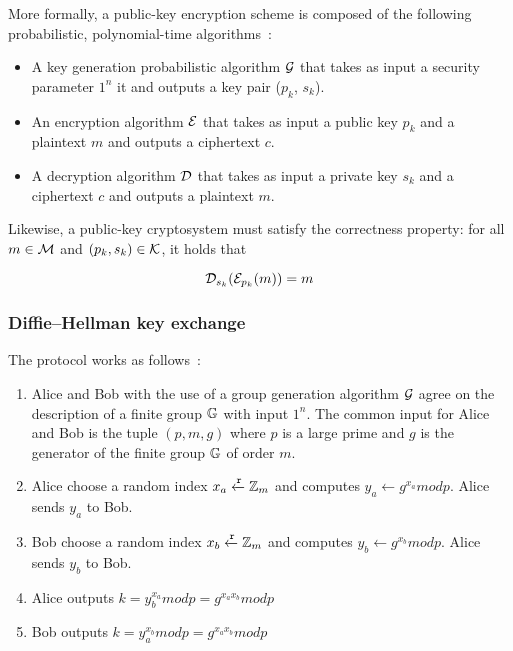 More formally, a public-key encryption scheme is composed of the following probabilistic, polynomial-time algorithms~\cite{Katz:2014:IMC:2700550, kiagias:crypto}:

\begin{itemize}
  \item A key generation probabilistic algorithm $\mathcal{G}$ that takes as input a security parameter $1^{n}$ it and outputs a key pair ($p_k$, $s_k$).
  \item An encryption algorithm $\mathcal{E}$ that takes as input a public key $p_k$ and a plaintext $m$ and outputs a ciphertext $c$.
  \item A decryption algorithm $\mathcal{D}$ that takes as input a private key $s_k$ and a ciphertext $c$ and outputs a plaintext $m$.
\end{itemize}

Likewise, a public-key cryptosystem must satisfy the correctness property: for all $m \in \mathcal{M}$ and $(p_k, s_k) \in \mathcal{K}$, it holds that

\begin{equation*}
  \mathcal{D}_{s_k}(\mathcal{E}_{p_k}(m)) = m
\end{equation*}

\subsubsection{Diffie–Hellman key exchange}
\label{preliminaries:crypto_block:pub:dh}

The protocol works as follows~\cite{Katz:2014:IMC:2700550, kiagias:crypto}:

\begin{enumerate}
  \item Alice and Bob  with the use of a group generation algorithm $\mathcal{G}$ agree on the description of a finite group $\mathbb{G}$ with input $1^{n}$. The common input for Alice and Bob is the tuple $(p, m, g)$ where $p$ is a large prime and $g$ is the generator of the finite group $\mathbb{G}$ of order $m$.
  \item Alice choose a random index $x_a \xleftarrow{\mathtt{r}}{\mathbb{Z}_m}$ and computes $y_a \leftarrow{g^{x_a}}modp$. Alice sends $y_a$ to Bob.
  \item Bob choose a random index $x_b \xleftarrow{\mathtt{r}}{\mathbb{Z}_m}$ and computes $y_b \leftarrow{g^{x_b}}modp$. Alice sends $y_b$ to Bob.
  \item Alice outputs $k = y_b^{x_a}modp = g^{{x_a}{x_b}}modp$
  \item Bob outputs $k = y_a^{x_b}modp = g^{{x_a}{x_b}}modp$
\end{enumerate}

